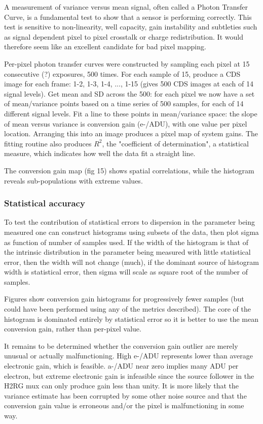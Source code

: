 \documentclass[10pt,fleqn]{article}
\begin{document}
A measurement of variance versus mean signal, often called a Photon Transfer Curve, is a fundamental test to show that a sensor is performing correctly. This test is sensitive to non-linearity, well capacity, gain instability and subtleties such as signal dependent pixel to pixel crosstalk or charge redistribution. It would therefore seem like an excellent candidate for bad pixel mapping.

Per-pixel photon transfer curves were constructed by sampling each pixel at 15 consecutive (?) exposures, 500 times. For each sample of 15, produce a CDS image for each frame: 1-2, 1-3, 1-4, ..., 1-15 (gives 500 CDS images at each of 14 signal levels). Get mean and SD across the 500: for each pixel we now have a set of mean/variance points based on a time series of 500 samples, for each of 14 different signal levels. Fit a line to these points in mean/variance space: the slope
of mean versus variance is conversion gain (e-/ADU), with one value per pixel location. Arranging this into an image produces a pixel map of system gains. The fitting routine also produces $R^2$, the "coefficient of determination", a statistical measure, which indicates how well the data fit a straight line. 

The conversion gain map (fig 15) shows spatial correlations, while the histogram reveals sub-populations with extreme values.

\subsubsection{Statistical accuracy}

To test the contribution of statistical errors to dispersion in the parameter being measured one can construct histograms using subsets of the data, then plot sigma as function of number of samples used. If the width of the histogram is that of the intrinsic distribution in the parameter being measured with little statistical error, then the width will not change (much), if the dominant source of histogram width is statistical error, then sigma will scale as square root of the number of samples.

Figures show conversion gain histograms for progressively fewer samples (but could have been performed using any of the metrics described). The core of the histogram is dominated entirely by statistical error so it is better to use the mean conversion gain, rather than per-pixel value.

It remains to be determined whether the conversion gain outlier are merely unusual or actually malfunctioning. High e-/ADU represents lower than average electronic gain, which is feasible. a-/ADU near zero implies many ADU per electron, but extreme electronic gain is infeasible since the source follower in the H2RG mux can only produce gain less than unity. It is more likely that the variance estimate has been corrupted by some other noise source and that the conversion gain value is erroneous and/or the pixel is malfunctioning in some way.  
\end{document}

